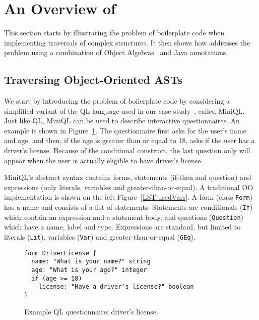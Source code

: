 \section{An Overview of \name}\label{subsec:overview}

This section starts by illustrating the problem of boilerplate code when implementing
traversals of complex structures. It then shows how \name addresses
the problem using a combination of Object Algebras~\cite{bruno12oa}
and Java annotations.

\subsection{Traversing Object-Oriented ASTs  }



We start by introducing the problem of boilerplate code by considering
a simplified variant of the QL language used in our case
study~\cite{gouseti14extensible}, called MiniQL.  Just like QL, MiniQL
can be used to describe interactive questionnaires. An example is
shown in Figure~\ref{driver_license}.  The questionnaire first asks
for the user's name and age, and then, if the age is greater than or
equal to 18, asks if the user has a driver's license.  Because of the
conditional construct, the last question only will appear when the
user is actually eligible to have driver's license.

MiniQL's abstract syntax contains forms, statements (if-then and question) and expressions (only literals, variables and greater-than-or-equal).
A traditional OO implementation is shown on the left Figure~\ref{LST:usedVars}.
A form (class \lstinline{Form}) has a name and consists of a list of statements.
Statements are conditionals (\lstinline{If}) which contain an expression and a statement body, and questions (\lstinline{Question}) which have a name, label and type. Expressions are standard, but limited to literals (\lstinline{Lit}), variables (\lstinline{Var}) and greater-than-or-equal (\lstinline{GEq}).

\begin{figure}[t]
\nocaptionrule
\begin{lstlisting}[language=ql]
form DriverLicense {
  name: "What is your name?" string
  age: "What is your age?" integer
  if (age >= 18)
    license: "Have a driver's license?" boolean
}
\end{lstlisting}
\caption{Example QL questionnaire: driver's license.}
\vspace{-.15in}
\label{driver_license}
\end{figure}

